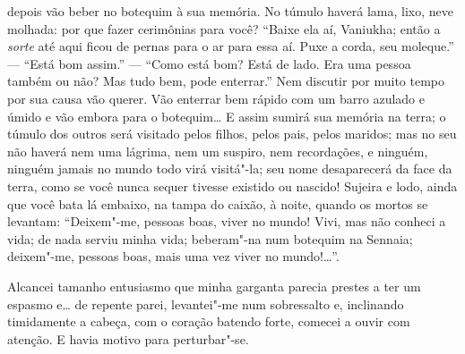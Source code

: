 depois vão beber no botequim à sua memória. No túmulo haverá lama,
lixo, neve molhada: por que fazer cerimônias para você? ``Baixe ela aí,
Vaniukha; então a \textit{sorte} até aqui ficou de pernas para o ar para essa
aí. Puxe a corda, seu moleque.'' --- ``Está bom assim.'' --- ``Como está bom?
Está de lado. Era uma pessoa também ou não? Mas tudo bem, pode
enterrar.'' Nem discutir por muito tempo por sua causa vão querer. Vão
enterrar bem rápido com um barro azulado e úmido e vão embora para o
botequim\ldots{} E assim sumirá sua memória na terra; o túmulo dos outros
será visitado pelos filhos, pelos pais, pelos maridos; mas no seu não
haverá nem uma lágrima, nem um suspiro, nem recordações, e ninguém,
ninguém jamais no mundo todo virá visitá"-la; seu nome desaparecerá da
face da terra, como se você nunca sequer tivesse existido ou nascido!
Sujeira e lodo, ainda que você bata lá embaixo, na tampa do caixão, à
noite, quando os mortos se levantam: ``Deixem"-me, pessoas boas, viver no
mundo! Vivi, mas não conheci a vida; de nada serviu minha vida;
beberam"-na num botequim na Sennaia; deixem"-me, pessoas boas, mais uma
vez viver no mundo!\ldots{}''.

Alcancei tamanho entusiasmo que minha garganta parecia prestes a ter um
espasmo e\ldots{} de repente parei, levantei"-me num sobressalto e,
inclinando timidamente a cabeça, com o coração batendo forte, comecei a
ouvir com atenção. E havia motivo para perturbar"-se.



